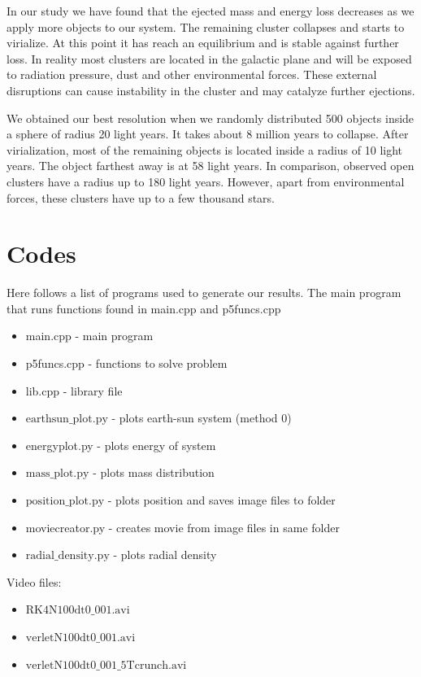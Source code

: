 \documentclass{aa}   %
\begin{document}
In our study we have found that the ejected mass and energy loss decreases as we apply more objects to our system. The remaining cluster collapses and starts to virialize. At this point it has reach an equilibrium and is stable against further loss. In reality most clusters are located in the galactic plane and will be exposed to radiation pressure, dust and other environmental forces. These external disruptions can cause instability in the cluster and may catalyze further ejections. 

We obtained our best resolution when we randomly distributed 500 objects inside a sphere of radius 20 light years. It takes about 8 million years to collapse. After virialization, most of the remaining objects is located inside a radius of 10 light years. The object farthest away is at 58 light years. In comparison, observed open clusters have a radius up to 180 light years. However, apart from environmental forces, these clusters have up to a few thousand stars. 

\section{Codes} \label{sec:codes}
Here follows a list of programs used to generate our results.
The main program that runs functions found in main.cpp and p5funcs.cpp
\begin{itemize}
\item main.cpp - main program
\item p5funcs.cpp - functions to solve problem
\item lib.cpp - library file
\item $\mathrm{earthsun\_plot.py}$ - plots earth-sun system (method 0)
\item energyplot.py - plots energy of system
\item $\mathrm{mass\_plot.py}$ - plots mass distribution
\item $\mathrm{position\_plot.py}$ - plots position and saves image files to folder
\item moviecreator.py - creates movie from image files in same folder
\item $\mathrm{radial\_density.py}$ - plots radial density
\end{itemize}
Video files: 
\begin{itemize}
\item $\mathrm{RK4N100dt0\_001.avi}$
\item $\mathrm{verletN100dt0\_001.avi}$
\item $\mathrm{verletN100dt0\_001\_5Tcrunch.avi}$
\end{itemize}
\end{document}
